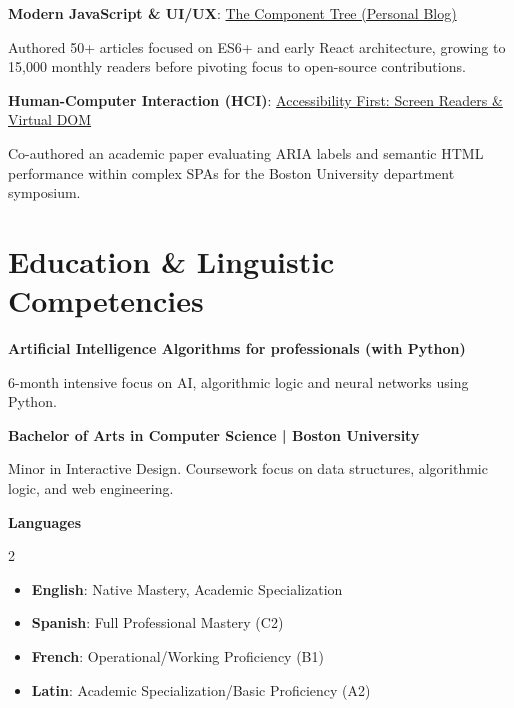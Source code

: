 \documentclass[letterpaper,10.5pt]{extarticle}
\begin{document}
{\textbf{\color{darktext}Modern JavaScript \& UI/UX}:} \href{https://example.com}{\color{Minty}The Component Tree (Personal Blog)}\par
{\small\color{graytext}Authored 50+ articles focused on ES6+ and early React architecture, growing to 15,000 monthly readers before pivoting focus to open-source contributions.}
\vspace{8pt} %

{\textbf{\color{darktext}Human-Computer Interaction (HCI)}:} \href{https://example.com}{\color{Minty}Accessibility First: Screen Readers \& Virtual DOM}\par
{\small\color{graytext}Co-authored an academic paper evaluating ARIA labels and semantic HTML performance within complex SPAs for the Boston University department symposium.}
\vspace{4pt} %

\section{\textcolor{Minty}{Edu}cation \& Linguistic Competencies}
\vspace{4pt}

\textbf{\color{darktext}Artificial Intelligence Algorithms for professionals (with Python)}\par
    {\small\color{graytext}6-month intensive focus on AI, algorithmic logic and neural networks using Python.}
\vspace{6pt} %

\textbf{\color{darktext}Bachelor of Arts in Computer Science | Boston University}\par
{\small\color{graytext}Minor in Interactive Design. Coursework focus on data structures, algorithmic logic, and web engineering.}
\vspace{5pt} %

\textbf{\color{darktext}Languages}
\vspace{9pt} 
\begin{multicols}{2}
    \begin{itemize}[leftmargin=0.15in, label={\textcolor{graytext}{$\vcenter{\hbox{\tiny$\bullet$}}$}}]
        \item \small{\color{darktext}\textbf{English}: Native Mastery, Academic Specialization}
        \item \small{\color{darktext}\textbf{Spanish}: Full Professional Mastery (C2)}
        \item \small{\color{darktext}\textbf{French}: Operational/Working Proficiency (B1)}
        \item \small{\color{darktext}\textbf{Latin}: Academic Specialization/Basic Proficiency (A2)}
    \end{itemize}
\end{multicols}
\end{document}
